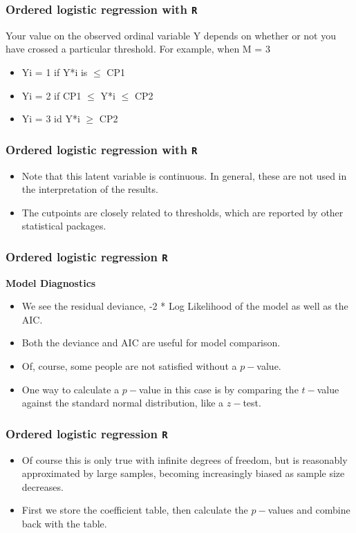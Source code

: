 \documentclass[00-GLMregslides.tex]{subfiles}
\begin{document}
\begin{frame}
\frametitle{Ordered logistic regression with \texttt{R} }
\Large
Your value on the
observed ordinal variable Y depends on whether or not you have crossed a particular threshold. For
example, when M = 3
\begin{itemize}
\item Yi = 1 if Y*i is $ \le $ CP1
\item Yi = 2 if CP1 $ \le $ Y*i $ \le $ CP2
\item Yi = 3 id Y*i $ \ge $ CP2
\end{itemize}
\end{frame}
\begin{frame}[fragile]
	\frametitle{Ordered logistic regression with \texttt{R} }
	\Large

\begin{itemize}
\item Note that this latent variable is continuous. In general, these are not used in the interpretation of the results. \item  The cutpoints are closely related to thresholds, which are reported by other statistical packages.
\end{itemize}
\end{frame}
\begin{frame}[fragile]
	\frametitle{Ordered logistic regression \texttt{R} }
	\Large
\textbf{Model Diagnostics}
\begin{itemize}
\item We see the residual deviance, -2 * Log Likelihood of the model as well as the AIC. 
\item Both the deviance and AIC are useful for model comparison.
\item Of, course, some people are not satisfied without a $p-$value.
\item One way to calculate a $p-$value in this case is by comparing the $t-$value against the standard normal distribution, like a $z-$test. 
\end{itemize}
\end{frame}
\begin{frame}[fragile]

\frametitle{Ordered logistic regression \texttt{R} }

	\Large
\begin{itemize}
\item Of course this is only true with infinite degrees of freedom, but is reasonably approximated by large 
samples, becoming increasingly biased as sample size decreases. 


\item First we store the coefficient table, then calculate the $p-$values and combine back with the table.

\end{itemize}
\end{frame}
\end{document}
